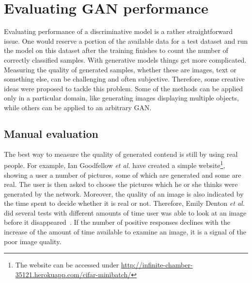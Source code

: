 \section{Evaluating GAN performance}
Evaluating performance of a discriminative model is a rather straightforward issue. One would reserve a portion of the available data  for a test dataset and run the model on this dataset after the training finishes to count the number of correctly classified samples. With generative models things get more complicated. Measuring the quality of generated samples, whether these are images, text or something else, can be challenging and often subjective. Therefore, some creative ideas were proposed to tackle this problem. Some of the methods can be applied only in a particular domain, like generating images displaying multiple objects, while others can be applied to an arbitrary GAN. 
\subsection{Manual evaluation}
The best way to measure the quality of generated contend is still by using real people. For example, Ian Goodfellow \textit{et al.} have created a simple website\footnote{The website can be accessed under  \url{http://infinite-chamber-35121.herokuapp.com/cifar-minibatch/}}, showing a user a number of pictures, some of which are generated and some are real. The user is then asked to choose the pictures which he or she thinks were generated by the network. Moreover, the quality of an image is also indicated by the time spent to decide whether it is real or not. Therefore, Emily Denton \textit{et al.} did several tests with different amounts of time user was able to look at an image before it disappeared~\cite{laplacian_gan}. If the number of positive responses declines with the increase of the amount of time available to examine an image, it is a signal of the poor image quality.


